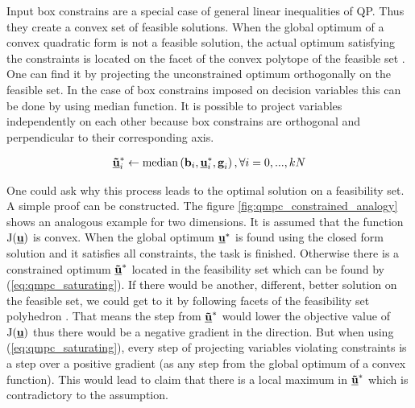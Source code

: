 Input box constrains are a special case of general linear inequalities of QP. Thus they create a convex set of feasible solutions. When the global optimum of a convex quadratic form is not a feasible solution, the actual optimum satisfying the constraints is located on the facet of the convex polytope of the feasible set \citep{boyd2004convex}. One can find it by projecting the unconstrained optimum orthogonally on the feasible set. In the case of box constrains imposed on decision variables this can be done by using $\mathrm{median}$ function. It is possible to project variables independently on each other because box constrains are orthogonal and perpendicular to their corresponding axis.

\begin{equation}
\begin{split}
\label{eq:qmpc_saturating}
\textbf{\underline{\~u}}^*_i \leftarrow \mathrm{median}\left(\textbf{b}_i, \textbf{\underline{u}}^*_i, \textbf{g}_i\right),  \forall i=0,...,kN
\end{split}
\end{equation}

\newcommand{\boundellipse}[3]%
{(#1) ellipse (#2 and #3)
}

One could ask why this process leads to the optimal solution on a feasibility set. A simple proof can be constructed. The figure \ref{fig:qmpc_constrained_analogy} shows an analogous example for two dimensions. It is assumed that the function $\mathrm{J}(\textbf{\underline{u}})$ is convex. When the global optimum $\textbf{\underline{u}}^*$ is found using the closed form solution and it satisfies all constraints, the task is finished. Otherwise there is a constrained optimum $\textbf{\underline{\~u}}^*$ located in the feasibility set which can be found by (\ref{eq:qmpc_saturating}). If there would be another, different, better solution on the feasible set, we could get to it by following facets of the feasibility set polyhedron \citep{boyd2004convex}. That means the step from $\textbf{\underline{\~u}}^*$ would lower the objective value of $\mathrm{J}(\textbf{\underline{u}})$ thus there would be a negative gradient in the direction. But when using (\ref{eq:qmpc_saturating}), every step of projecting variables violating constraints is a step over a positive gradient (as any step from the global optimum of a convex function). This would lead to claim that there is a local maximum in $\textbf{\underline{\~u}}^*$ which is contradictory to the assumption.

